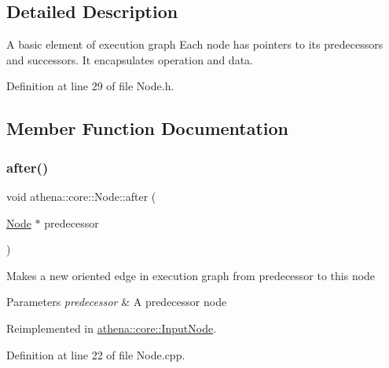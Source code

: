 \subsection{Detailed Description}
A basic element of execution graph Each node has pointers to its predecessors and successors. It encapsulates operation and data. 

Definition at line 29 of file Node.\+h.



\subsection{Member Function Documentation}
\mbox{\label{classathena_1_1core_1_1_node_aefef588463c8e215e998415a7cc6b320}} 
\subsubsection{\texorpdfstring{after()}{after()}}
{\footnotesize\ttfamily void athena\+::core\+::\+Node\+::after (\begin{DoxyParamCaption}\item[{\mbox{\hyperlink{classathena_1_1core_1_1_node}{Node}} $\ast$}]{predecessor }\end{DoxyParamCaption})\hspace{0.3cm}{\ttfamily [virtual]}}

Makes a new oriented edge in execution graph from predecessor to this node 
\begin{DoxyParams}{Parameters}
{\em predecessor} & A predecessor node \\
\hline
\end{DoxyParams}


Reimplemented in \mbox{\hyperlink{classathena_1_1core_1_1_input_node_aaec12f4c76b6d9890efe1fb4337a1b61}{athena\+::core\+::\+Input\+Node}}.



Definition at line 22 of file Node.\+cpp.

\mbox{\label{classathena_1_1core_1_1_node_a6ae012557fc6b29127366b1e92801d4a}} 
